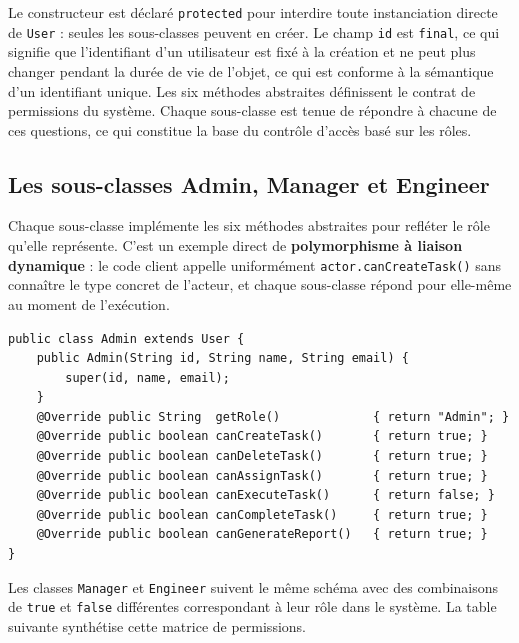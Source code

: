 \documentclass[11pt]{article}
\begin{document}
Le constructeur est déclaré \texttt{protected} pour interdire toute
instanciation directe de \texttt{User} : seules les sous-classes peuvent
en créer. Le champ \texttt{id} est \texttt{final}, ce qui signifie que
l'identifiant d'un utilisateur est fixé à la création et ne peut plus
changer pendant la durée de vie de l'objet, ce qui est conforme à la
sémantique d'un identifiant unique. Les six méthodes abstraites
définissent le contrat de permissions du système. Chaque sous-classe est
tenue de répondre à chacune de ces questions, ce qui constitue la base du
contrôle d'accès basé sur les rôles.

\subsection{Les sous-classes Admin, Manager et Engineer}
Chaque sous-classe implémente les six méthodes abstraites pour refléter
le rôle qu'elle représente. C'est un exemple direct de
\textbf{polymorphisme à liaison dynamique} : le code client appelle
uniformément \texttt{actor.canCreateTask()} sans connaître le type
concret de l'acteur, et chaque sous-classe répond pour elle-même au
moment de l'exécution.

\begin{lstlisting}[caption={Sous-classe Admin}]
public class Admin extends User {
    public Admin(String id, String name, String email) {
        super(id, name, email);
    }
    @Override public String  getRole()             { return "Admin"; }
    @Override public boolean canCreateTask()       { return true; }
    @Override public boolean canDeleteTask()       { return true; }
    @Override public boolean canAssignTask()       { return true; }
    @Override public boolean canExecuteTask()      { return false; }
    @Override public boolean canCompleteTask()     { return true; }
    @Override public boolean canGenerateReport()   { return true; }
}
\end{lstlisting}

Les classes \texttt{Manager} et \texttt{Engineer} suivent le même schéma
avec des combinaisons de \texttt{true} et \texttt{false} différentes
correspondant à leur rôle dans le système. La table suivante synthétise
cette matrice de permissions.
\end{document}
